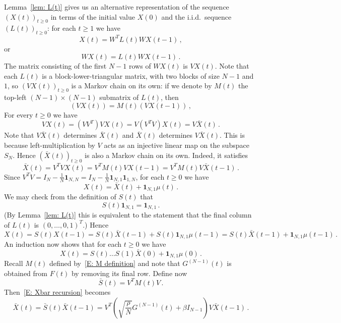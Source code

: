 \documentclass[12pt]{article}
\newcommand{\1}{\mathbf{1}}
\begin{document}
Lemma~\ref{lem: L(t)} gives us an alternative representation of the sequence $\left(X(t)\right)_{t \ge 0}$ in terms of the initial value $X(0)$ and the i.i.d.~sequence $\left(L(t)\right)_{t \ge 0}$: for each $t \ge 1$ we have
$$ 
X(t) = W^T L(t) W X(t-1)\,,
$$
or
$$ 
WX(t) = L(t) W X(t-1)\,.
$$
The matrix consisting of the first $N-1$ rows of $WX(t)$ is $VX(t)$. Note that each $L(t)$ is a block-lower-triangular matrix, with two blocks of size $N-1$ and $1$, so $\left(VX(t)\right)_{t \ge 0}$ is a Markov chain on its own: 
if we denote by $M(t)$  the top-left $(N-1)\times(N-1)$ submatrix of $L(t)$, then 
$$ 
\left(VX(t)\right) = M(t) \left(V X(t-1)\right)\,,
$$ 
For every $t \ge 0$ we have 
$$ 
VX(t) = (VV^T)VX(t) = V(V^T V) X(t) = V \bar X(t)\,.
$$ 
{Note that $V \bar X(t)$ determines $\bar X(t)$ and $\bar X(t)$ determines $V \bar X(t)$. This is because left-multiplication by $V$ acts as an injective linear map on the subspace $S_N$.} Hence $\left(\bar X(t)\right)_{t \ge 0}$  is also a Markov chain on its own. Indeed, it satisfies
\begin{equation}\label{E: Xbar recursion} 
\bar{X}(t) = V^T VX(t) = V^TM(t)VX(t-1) =  V^T M(t) V \bar{X}(t-1)\,.
\end{equation}
Since $V^TV = I_N - \frac{1}{N}\mathbf{1}_{N,N} = I_N - \frac{1}{N}\mathbf{1}_{N,1}\mathbf{1}_{1,N}$, for each $t \ge 0$ we have
\begin{equation}\label{E: X(t) as a sum} 
X(t) = \bar{X}\!(t) + \mathbf{1}_{N,1}\mu(t)\,.
\end{equation}
We may check from the definition of $S(t)$ that
$$ 
S(t) \mathbf{1}_{N,1} = \mathbf{1}_{N,1}\,. 
$$
(By Lemma~\ref{lem: L(t)} this is equivalent to the statement that the final column of $L(t)$ is $(0, \dots, 0,1)^T$.)
Hence
$$
X(t) = S(t) X(t-1) = S(t) \bar{X}(t-1)  + S(t)\mathbf{1}_{N,1} \mu(t-1) = S(t) \bar{X}(t-1)  + \mathbf{1}_{N,1} \mu(t-1)\,.
$$
An induction now shows that for each $t \ge 0$ we have
$$ 
X(t) = S(t) \dots S(1) \bar{X}(0) + \mathbf{1}_{N,1} \mu(0)\,.
$$
Recall $M(t)$ defined by~\eqref{E: M definition}
and note that $G^{(N-1)}(t)$ is obtained from $F(t)$ by removing its final row. Define now
$$
\bar{S}(t) = V^T M(t) V\,.
$$  Then~\eqref{E: Xbar recursion} becomes 
\begin{equation}\label{eq:recur}
\bar{X}(t) = \bar{S}(t) \bar{X}(t-1) = V^{T}\left(
\sqrt{\frac{\rho}N}G^{(N-1)}\!(t)
+ \beta I_{N-1}\right)V \bar{X}(t-1)\,.  
\end{equation} 
\end{document}
